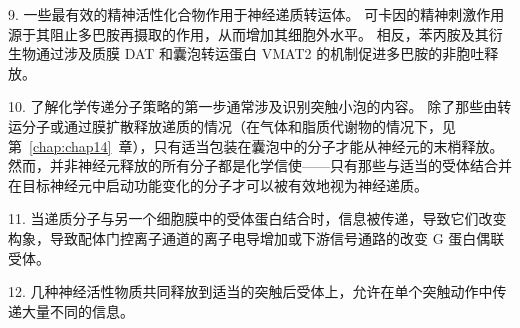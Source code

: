 9. 一些最有效的精神活性化合物作用于神经递质转运体。
可卡因的精神刺激作用源于其阻止多巴胺再摄取的作用，从而增加其细胞外水平。
相反，苯丙胺及其衍生物通过涉及质膜 DAT 和囊泡转运蛋白 VMAT2 的机制促进多巴胺的非胞吐释放。 


10. 了解化学传递分子策略的第一步通常涉及识别突触小泡的内容。
除了那些由转运分子或通过膜扩散释放递质的情况（在气体和脂质代谢物的情况下，见第~\ref{chap:chap14}~章），只有适当包装在囊泡中的分子才能从神经元的末梢释放。
然而，并非神经元释放的所有分子都是化学信使——只有那些与适当的受体结合并在目标神经元中启动功能变化的分子才可以被有效地视为神经递质。 


11. 当递质分子与另一个细胞膜中的受体蛋白结合时，信息被传递，导致它们改变构象，导致配体门控离子通道的离子电导增加或下游信号通路的改变 G 蛋白偶联受体。 


12. 几种神经活性物质共同释放到适当的突触后受体上，允许在单个突触动作中传递大量不同的信息。

